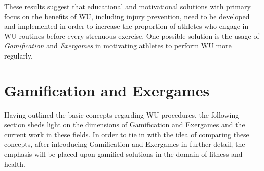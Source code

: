 These results suggest that educational and motivational solutions with primary focus on the benefits of WU, including injury prevention, need to be developed and implemented in order to increase the proportion of athletes who engage in WU routines before every strenuous exercise. One possible solution is the usage of \textit{Gamification} and \textit{Exergames} in motivating athletes to perform WU more regularly. 
\pagebreak
\section{Gamification and Exergames}
Having outlined the basic concepts regarding WU procedures, the following section sheds light 
on the dimensions of Gamification and Exergames and the current work in these fields. In order to tie in with the idea of comparing these concepts, after introducing Gamification and Exergames in further detail, the emphasis will be placed upon gamified solutions in the domain of fitness and health. 
